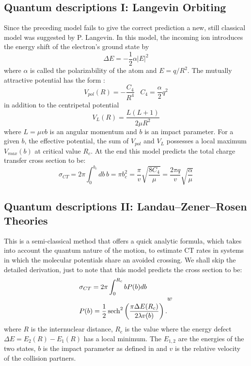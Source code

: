 \subsection*{Quantum descriptions I: Langevin Orbiting}
Since the preceding model fails to give the correct prediction a new, still classical model was suggested by P. Langevin. In this model, the incoming ion introduces the energy shift of the electron's ground state by
\begin{equation}
  \Delta E = -\frac{1}{2}\alpha|E|^2  
 \end{equation}
 where $ \alpha $ is called the polarizability of the atom and $ E = q/R^2 $. The mutually attractive potential has the form :
\begin{equation}
  V_{pol}(R) = -\frac{C_4}{R^4}\,\,\,\,\,C_4 = \frac{\alpha}{2}q^2
\end{equation}
in addition to the centripetal potential
\begin{equation}
  V_L(R) = \frac{L(L+1)}{2\mu R^2}
\end{equation}
where $ L = \mu v b $ is an angular momentum and $ b $ is an impact parameter. For a given $ b $, the effective potential, the sum of $ V_{pol} $ and $ V_L $ possesses a local maximum $ V_{max}(b) $ at critical value $ R_c $.
At the end this model predicts the total charge transfer cross section to be:
\begin{equation}
  \sigma_{CT} = 2\pi \int_0^{b_c}{db\, b} = \pi b_c^2 = \frac{\pi}{v}\sqrt{\frac{8 C_4}{\mu}} = \frac{2\pi q}{v}\sqrt{\frac{\alpha}{\mu}}
\end{equation}

\subsection*{Quantum descriptions II: Landau–Zener–Rosen Theories}
This is a semi-classical method that offers a quick analytic formula, which takes into account the quantum nature of the motion, to estimate CT rates in systems in which the molecular potentials share an avoided crossing.  We shall skip the detailed derivation, just to note that this model predicts the cross section to be:
\begin{equation}
\begin{split}
  & \sigma_{CT} = 2\pi \int_0^{R_c}{b P(b) db} \\[.8em]
  & P(b) = \frac{1}{2}\operatorname{sech}^2\left(\frac{\pi \Delta E(R_c)}{2\lambda v(b)}\right).
\end{split}
w\end{equation}
where $ R $ is the internuclear distance, $ R_c $ is the value where the energy defect $ \Delta E = E_2(R) - E_1(R) $ has a local minimum. The $ E_{1,2} $ are the energies of the two states, $ b $ is the impact parameter as defined in \cite{ZygelmanCT} and $ v $ is the relative velocity of the collision partners.

